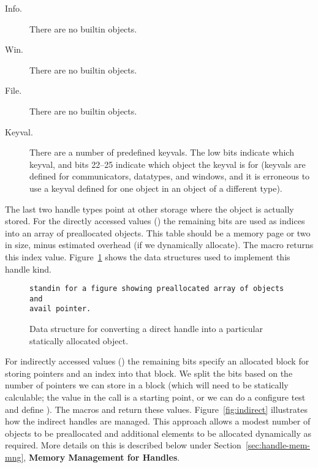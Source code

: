 \documentclass{article}
\begin{document}
\begin{description}
\item[Info.] There are no builtin  objects.
\item[Win.] There are no builtin  objects.
\item[File.] There are no builtin  objects.
\item[Keyval.] There are a number of predefined keyvals.  The low bits
  indicate which keyval, and bits 22--25 indicate which object the
  keyval is for (keyvals are defined for communicators, datatypes, and
  windows, and it is erroneous to use a keyval defined for one object
  in an object of a different type).
\end{description}

The last two handle types point at other storage where the object is
actually stored.
For the directly accessed values () the
remaining bits are used as indices into 
an array of preallocated objects.
This table should be 
a memory page or two in size, 
minus estimated  overhead (if we dynamically allocate).
The macro  returns this index value.
Figure~\ref{fig:handle-direct} shows the data structures used to
implement this handle kind.

\begin{figure}
\begin{verbatim}
standin for a figure showing preallocated array of objects and
avail pointer.
\end{verbatim}
\caption{Data structure for converting a direct handle into a
particular statically allocated object.}
\label{fig:handle-direct}
\end{figure}

For indirectly accessed values () the
remaining bits specify an allocated block 
for storing pointers and an index into that block.  We split the bits
based on the number of pointers we can store in a block (which will need
to be statically calculable; the  value in the
 call is a starting point, or we can  do a configure test and
define ). 
The macros  and 
return these values.
Figure~\ref{fig:indirect} illustrates how the indirect handles are managed.
This approach allows a modest number of objects to be preallocated and
additional elements to be allocated dynamically as required.  More
details on this is described below under
Section~\ref{sec:handle-mem-mng}, \textbf{Memory Management for 
Handles}. 
\end{document}
